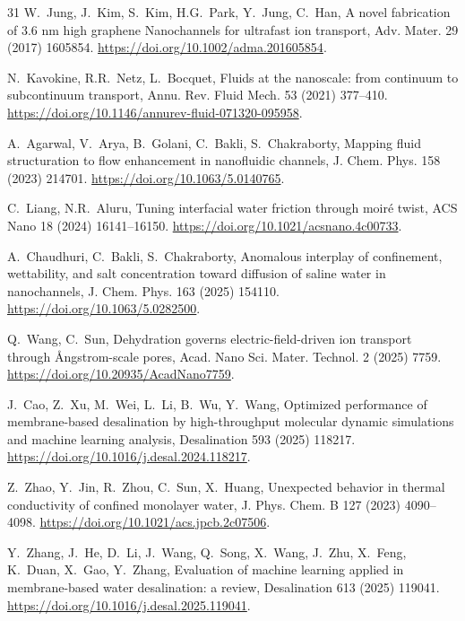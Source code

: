 \documentclass[3p,preprint,12pt,numbers,square,sort&compress]{elsarticle}
\begin{document}
\begin{thebibliography}{31}
W.~Jung, J.~Kim, S.~Kim, H.G.~Park, Y.~Jung, C.~Han, A novel fabrication of 3.6 nm high graphene Nanochannels for ultrafast ion transport, Adv. Mater. 29 (2017) 1605854. \href{https://doi.org/10.1002/adma.201605854}{https://doi.org/10.1002/adma.201605854}.

N.~Kavokine, R.R.~Netz, L.~Bocquet, Fluids at the nanoscale: from continuum to subcontinuum transport, Annu. Rev. Fluid Mech. 53 (2021) 377--410. \href{https://doi.org/10.1146/annurev-fluid-071320-095958}{https://doi.org/10.1146/annurev-fluid-071320-095958}.

A.~Agarwal, V.~Arya, B.~Golani, C.~Bakli, S.~Chakraborty, Mapping fluid structuration to flow enhancement in nanofluidic channels, J. Chem. Phys. 158 (2023) 214701. \href{https://doi.org/10.1063/5.0140765}{https://doi.org/10.1063/5.0140765}.

C.~Liang, N.R.~Aluru, Tuning interfacial water friction through moiré twist, ACS Nano 18 (2024) 16141--16150. \href{https://doi.org/10.1021/acsnano.4c00733}{https://doi.org/10.1021/acsnano.4c00733}.

A.~Chaudhuri, C.~Bakli, S.~Chakraborty, Anomalous interplay of confinement, wettability, and salt concentration toward diffusion of saline water in nanochannels, J. Chem. Phys. 163 (2025) 154110. \href{https://doi.org/10.1063/5.0282500}{https://doi.org/10.1063/5.0282500}.

Q.~Wang, C.~Sun, Dehydration governs electric-field-driven ion transport through Ångstrom-scale pores, Acad. Nano Sci. Mater. Technol. 2 (2025) 7759. \href{https://doi.org/10.20935/AcadNano7759}{https://doi.org/10.20935/AcadNano7759}.

J.~Cao, Z.~Xu, M.~Wei, L.~Li, B.~Wu, Y.~Wang, Optimized performance of membrane-based desalination by high-throughput molecular dynamic simulations and machine learning analysis, Desalination 593 (2025) 118217. \href{https://doi.org/10.1016/j.desal.2024.118217}{https://doi.org/10.1016/j.desal.2024.118217}.

Z.~Zhao, Y.~Jin, R.~Zhou, C.~Sun, X.~Huang, Unexpected behavior in thermal conductivity of confined monolayer water, J. Phys. Chem. B 127 (2023) 4090--4098. \href{https://doi.org/10.1021/acs.jpcb.2c07506}{https://doi.org/10.1021/acs.jpcb.2c07506}.

Y.~Zhang, J.~He, D.~Li, J.~Wang, Q.~Song, X.~Wang, J.~Zhu, X.~Feng, K.~Duan, X.~Gao, Y.~Zhang, Evaluation of machine learning applied in membrane-based water desalination: a review, Desalination 613 (2025) 119041. \href{https://doi.org/10.1016/j.desal.2025.119041}{https://doi.org/10.1016/j.desal.2025.119041}.


\end{thebibliography}
\end{document}
